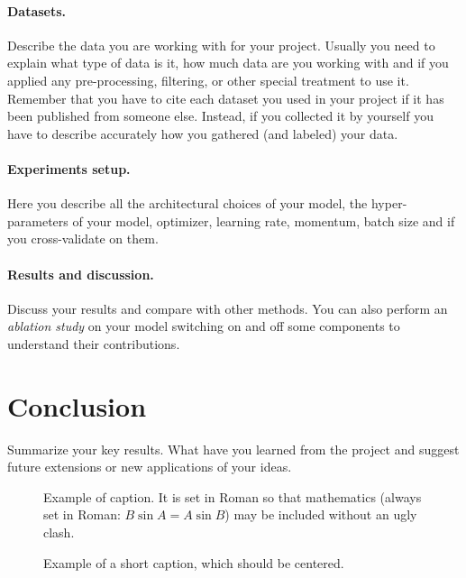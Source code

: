 \documentclass[10pt,twocolumn,letterpaper]{article}
\begin{document}
\paragraph{Datasets.}
Describe the data you are working with for your project. Usually you need to explain what type of data is it, how much data are you working with and if you applied any pre-processing, filtering, or other special treatment to use it. Remember that you have to cite each dataset you used in your project if it has been published from someone else. Instead, if you collected it by yourself you have to describe accurately how you gathered (and labeled) your data. 

\paragraph{Experiments setup.}
Here you describe all the architectural choices of your model, the hyper-parameters of your model, \eg optimizer, learning rate, momentum, batch size and if you cross-validate on them. 

\paragraph{Results and discussion.}
Discuss your results and compare with other methods. You can also perform an \emph{ablation study} on your model switching on and off some components to understand their contributions.

\section{Conclusion} 
Summarize your key results. What have you learned from the project and suggest future extensions or new applications of your ideas.


\begin{figure}[t]
\begin{center}
\fbox{\rule{0pt}{2in} \rule{0.9\linewidth}{0pt}}
\end{center}
   \caption{Example of caption.  It is set in Roman so that mathematics
   (always set in Roman: $B \sin A = A \sin B$) may be included without an
   ugly clash.}
\label{fig:long}
\label{fig:onecol}
\end{figure}


\begin{figure}
\begin{center}
\fbox{\rule{0pt}{2in} \rule{.9\linewidth}{0pt}}
\end{center}
   \caption{Example of a short caption, which should be centered.}
\label{fig:short}
\end{figure}
\end{document}
